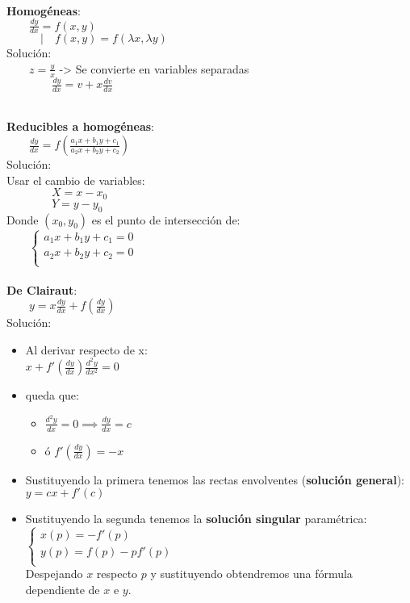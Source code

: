 \documentclass[a4paper,landscape,10pt]{cheatsheet}
\begin{document}
\hfill\\
\textbf{Homogéneas}:\\
$\qquad \frac{dy}{dx}=f(x,y)$\\
$\qquad\quad | \quad f(x,y)=f(\lambda x, \lambda y)$\\
Solución:\\
$\qquad z=\frac{y}{x}$ -> Se convierte en variables separadas\\
$\qquad\qquad \frac{dy}{dx}=v+x\frac{dv}{dx}$

\hfill\\
\textbf{Reducibles a homogéneas}:\\
$\qquad \frac{dy}{dx}=f(\frac{a_1x+b_1y+c_1}{a_2x+b_2y+c_2})$\\
Solución:\\
\qquad Usar el cambio de variables:\\
$\qquad\qquad X=x-x_0$\\
$\qquad\qquad Y=y-y_0$\\
\qquad Donde $(x_0,y_0)$ es el punto de intersección de:\\
$\qquad\begin{cases}
    a_1x+b_1y+c_1=0 \\
    a_2x+b_2y+c_2=0 \\
  \end{cases}
$\\


\hfill\\
\textbf{De Clairaut}:\\
$\qquad y=x\frac{dy}{dx}+f(\frac{dy}{dx})$\\
Solución:\\
\begin{itemize}
  \item Al derivar respecto de x:\\
        $x+f'(\frac{dy}{dx})\frac{d^2y}{dx^2}=0$\\
  \item queda que:\\
        \begin{itemize}
          \item $\frac{d^2y}{dx}=0\implies\frac{dy}{dx}=c$
          \item ó $f'(\frac{dy}{dx})=-x$
        \end{itemize}
  \item Sustituyendo la primera tenemos las rectas envolventes (\textbf{solución general}):\\
        $y=cx+f'(c)$\\
  \item Sustituyendo la segunda tenemos la \textbf{solución singular} paramétrica:\\
        $
          \begin{cases}
            x(p)=-f'(p)      \\
            y(p)=f(p)-pf'(p) \\
          \end{cases}
        $\\
        Despejando $x$ respecto $p$ y sustituyendo obtendremos una fórmula dependiente de $x$ e $y$.
\end{itemize}
\end{document}
